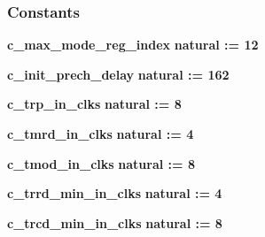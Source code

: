 \subsubsection*{Constants}
 \begin{DoxyCompactItemize}
\item 
{\bf c\+\_\+max\+\_\+mode\+\_\+reg\+\_\+index} {\bfseries \textcolor{comment}{natural}\textcolor{vhdlchar}{ }\textcolor{vhdlchar}{ }\textcolor{vhdlchar}{\+:}\textcolor{vhdlchar}{=}\textcolor{vhdlchar}{ }\textcolor{vhdlchar}{ } \textcolor{vhdldigit}{12} \textcolor{vhdlchar}{ }} 
\item 
{\bf c\+\_\+init\+\_\+prech\+\_\+delay} {\bfseries \textcolor{comment}{natural}\textcolor{vhdlchar}{ }\textcolor{vhdlchar}{ }\textcolor{vhdlchar}{\+:}\textcolor{vhdlchar}{=}\textcolor{vhdlchar}{ }\textcolor{vhdlchar}{ } \textcolor{vhdldigit}{162} \textcolor{vhdlchar}{ }} 
\item 
{\bf c\+\_\+trp\+\_\+in\+\_\+clks} {\bfseries \textcolor{comment}{natural}\textcolor{vhdlchar}{ }\textcolor{vhdlchar}{ }\textcolor{vhdlchar}{\+:}\textcolor{vhdlchar}{=}\textcolor{vhdlchar}{ }\textcolor{vhdlchar}{ } \textcolor{vhdldigit}{8} \textcolor{vhdlchar}{ }} 
\item 
{\bf c\+\_\+tmrd\+\_\+in\+\_\+clks} {\bfseries \textcolor{comment}{natural}\textcolor{vhdlchar}{ }\textcolor{vhdlchar}{ }\textcolor{vhdlchar}{\+:}\textcolor{vhdlchar}{=}\textcolor{vhdlchar}{ }\textcolor{vhdlchar}{ } \textcolor{vhdldigit}{4} \textcolor{vhdlchar}{ }} 
\item 
{\bf c\+\_\+tmod\+\_\+in\+\_\+clks} {\bfseries \textcolor{comment}{natural}\textcolor{vhdlchar}{ }\textcolor{vhdlchar}{ }\textcolor{vhdlchar}{\+:}\textcolor{vhdlchar}{=}\textcolor{vhdlchar}{ }\textcolor{vhdlchar}{ } \textcolor{vhdldigit}{8} \textcolor{vhdlchar}{ }} 
\item 
{\bf c\+\_\+trrd\+\_\+min\+\_\+in\+\_\+clks} {\bfseries \textcolor{comment}{natural}\textcolor{vhdlchar}{ }\textcolor{vhdlchar}{ }\textcolor{vhdlchar}{\+:}\textcolor{vhdlchar}{=}\textcolor{vhdlchar}{ }\textcolor{vhdlchar}{ } \textcolor{vhdldigit}{4} \textcolor{vhdlchar}{ }} 
\item 
{\bf c\+\_\+trcd\+\_\+min\+\_\+in\+\_\+clks} {\bfseries \textcolor{comment}{natural}\textcolor{vhdlchar}{ }\textcolor{vhdlchar}{ }\textcolor{vhdlchar}{\+:}\textcolor{vhdlchar}{=}\textcolor{vhdlchar}{ }\textcolor{vhdlchar}{ } \textcolor{vhdldigit}{8} \textcolor{vhdlchar}{ }} 
\item 

\end{DoxyCompactItemize}
